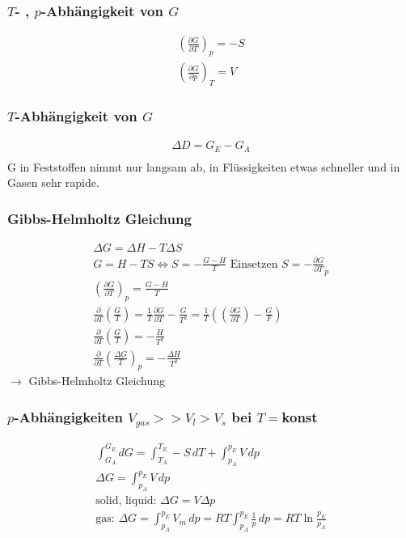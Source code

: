 \documentclass[a4paper, fleqn]{article}
\begin{document}
\subsubsection{$T$- , $p$-Abhängigkeit von $G$}
\begin{eqnarray*}
    \left(\frac{\partial G}{\partial T}\right)_p = -S\\
    \left(\frac{\partial G}{\partial p}\right)_T = V
\end{eqnarray*}

\subsubsection{$T$-Abhängigkeit von $G$}
\begin{eqnarray*}
    \Delta D = G_E - G_A\\
\end{eqnarray*}
G in Feststoffen nimmt nur langsam ab, in Flüssigkeiten etwas schneller und in Gasen sehr rapide.

\subsubsection{Gibbs-Helmholtz Gleichung}
\begin{eqnarray*}
    \Delta G = \Delta H - T \Delta S\\
    G = H-TS \Leftrightarrow S= -\frac{G-H}{T} \text{ Einsetzen } S=-\frac{\partial G}{\partial T}_p\\
    \left(\frac{\partial G}{\partial T}\right)_p = \frac{G-H}{T}\\
    \frac{\partial}{\partial T}\left(\frac{G}{T}\right) = \frac{1}{T}\frac{\partial G}{\partial T} - \frac{G}{T^2}=\frac{1}{T}\left(\left(\frac{\partial G}{\partial T}\right)-\frac{G}{F}\right)\\
    \frac{\partial}{\partial T}\left(\frac{G}{T}\right) = -\frac{H}{T^2}\\
    \frac{\partial}{\partial T}\left(\frac{\Delta G}{T}\right)_p = -\frac{\Delta H}{T^2}
\end{eqnarray*}
$\rightarrow$ Gibbs-Helmholtz Gleichung

\subsubsection{$p$-Abhängigkeiten $V_{gas}>>V_l>V_s$ bei $T =$konst}
\begin{eqnarray*}
    \int_{G_A}^{G_E}dG = \int_{T_A}^{T_E}-S\,dT+\int_{p_A}^{p_E}V\,dp\\
    \Delta G = \int_{p_A}^{p_E}V\,dp\\
    \text{solid, liquid: } \Delta G = V\Delta p\\
    \text{gas: } \Delta G = \int_{p_A}^{p_E}V_m\,dp=RT\int_{p_A}^{p_E}\frac{1}{p}\,dp=RT\ln\frac{p_E}{p_A}
\end{eqnarray*}
\end{document}
